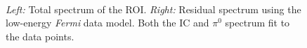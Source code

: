 \documentclass[a4paper]{article}
\newcommand{\Fermi}{\textit{Fermi} }
\begin{document}
\begin{figure}[H]
	\\
\caption{\textit{Left:} Total spectrum of the ROI. \textit{Right:} Residual spectrum using the low-energy \Fermi  data model. Both the IC and $\pi^0$ spectrum fit to the data points.}
\label{Fit_IC_pi0_to_ROI}
\end{figure}
\end{document}
